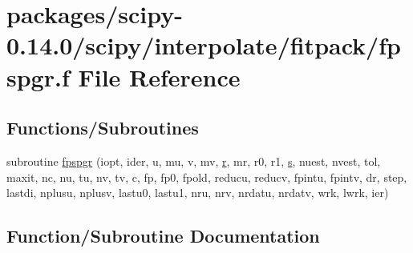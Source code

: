 \hypertarget{fpspgr_8f}{}\section{packages/scipy-\/0.14.0/scipy/interpolate/fitpack/fpspgr.f File Reference}
\label{fpspgr_8f}
\subsection*{Functions/\+Subroutines}
\begin{DoxyCompactItemize}
\item 
subroutine \hyperlink{fpspgr_8f_a72390751ed710382aa3e2ef259e2a700}{fpspgr} (iopt, ider, u, mu, v, mv, \hyperlink{indexexpr_8h_ac434fd11cc2493608d8d91424d60c17e}{r}, mr, r0, r1, \hyperlink{indexexpr_8h_ae024b0db549122b44c349ae28ec990dc}{s}, nuest, nvest, tol, maxit, nc, nu, tu, nv, tv, c, fp, fp0, fpold, reducu, reducv, fpintu, fpintv, dr, step, lastdi, nplusu, nplusv, lastu0, lastu1, nru, nrv, nrdatu, nrdatv, wrk, lwrk, ier)
\end{DoxyCompactItemize}


\subsection{Function/\+Subroutine Documentation}
\hypertarget{fpspgr_8f_a72390751ed710382aa3e2ef259e2a700}{}
